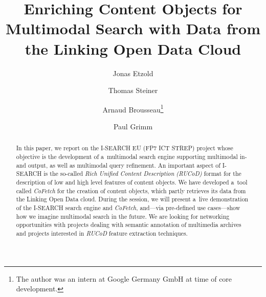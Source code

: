 \documentclass[runningheads,a4paper]{llncs}
\begin{document}
\mainmatter

\title{Enriching Content Objects for Multimodal Search with Data from the Linking Open Data Cloud}

\author{Jonas Etzold \and Thomas Steiner \and Arnaud Brousseau\thanks{The author was an intern at Google Germany GmbH at time of core development.} \and Paul Grimm}


\maketitle

\setcounter{footnote}{0}

\begin{abstract}
In this paper, we report on the \mbox{I-SEARCH} EU (FP7 ICT STREP) project
whose objective is the development of a~multimodal search engine supporting multimodal
in- and output, as well as multimodal query refinement.
An important aspect of \mbox{I-SEARCH} is the so-called
\emph{Rich Unified Content Description} \emph{\mbox{(RUCoD)}} format
for the description of low and high level features of content objects.
We have developed a~tool called \mbox{\emph{CoFetch}}
for the creation of content objects,
which partly retrieves its data from the Linking Open Data cloud.
During the session, we will present a~live demonstration of the \mbox{I-SEARCH}
search engine and \mbox{\emph{CoFetch}}, and---via pre-defined use cases---show
how we imagine multimodal search in the future.
We are looking for networking opportunities with projects dealing with
semantic annotation of multimedia archives and 
projects interested in \emph{RUCoD} feature extraction techniques.
\end{abstract}
\end{document}
